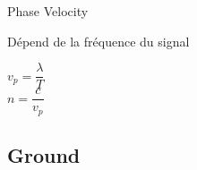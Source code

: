 \begin{frame}{Phase Velocity}
    \begin{twocolumns}[0.33]
        \leftcol
        \begin{makelist}[\small][1.5]
            \icon{\faStumbleupon} Dépend de la fréquence du signal
        \end{makelist}

        \begin{center}
            $v_p = \dfrac{\lambda}{T}$\\
            \vspace{6pt}
            $n = \dfrac{c}{v_p}$
        \end{center}

        \rightcol
    \end{twocolumns}
\end{frame}


\subsection[5min-Pascal]{Ground }

